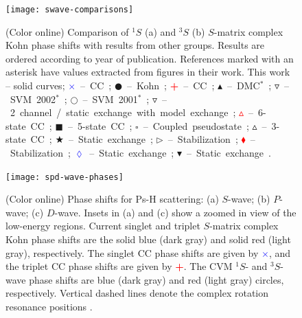 \documentclass[preprint,showpacs,showkeys,preprintnumbers,amsmath,amssymb,longbibliography,pra,aps]{revtex4-1}
\begin{document}
{%
\begin{figure}[H]
	\centering
	\texttt{[image: swave-comparisons]}
	\caption{(Color online) Comparison of $^1S$ (a) and $^3S$ (b) $S$-matrix
complex Kohn phase shifts with results from other groups. Results are ordered
according to year of publication. References marked with an asterisk have values
extracted from figures in their work. 
This work -- solid curves;
\mbox{\textcolor{blue}{$\times$} -- CC \cite{Walters2004};}
\mbox{$\CIRCLE$ -- Kohn \cite{VanReeth2003};}
\mbox{\textcolor{red}{\textbf{+}} -- CC \cite{Blackwood2002};}
\mbox{$\blacktriangle$ -- DMC$^*$ \cite{Chiesa2002};} 
\mbox{$\triangledown$ -- SVM 2002$^*$ \cite{Ivanov2002};} 
\mbox{$\Circle$ -- SVM 2001$^*$ \cite{Ivanov2001};} 
\mbox{\textcolor[RGB]{0,127,0}{$\triangledown$} -- 2 channel / static exchange with model exchange \cite{Biswas2001};} 
\mbox{\textcolor{red}{$\vartriangle$} -- 6-state CC \cite{Sinha2000};} 
\mbox{$\blacksquare$ -- 5-state CC \cite{Adhikari1999};} 
\mbox{$\square$ -- Coupled pseudostate \cite{Campbell1998};} 
\mbox{$\vartriangle$ -- 3-state CC \cite{Sinha1997};} 
\mbox{\textcolor[RGB]{0,127,0}{$\bigstar$} -- Static exchange \cite{Ray1997,*Ray1996};} 
\mbox{$\triangleright$ -- Stabilization \cite{Drachman1976};} 
\mbox{\textcolor{red}{$\blacklozenge$} -- Stabilization \cite{Drachman1975};}
\mbox{\textcolor{blue}{$\lozenge$} -- Static exchange \cite{Hara1975};}
\mbox{$\blacktriangledown$ -- Static exchange \cite{Fraser1961}.}}
	\label{fig:swave-comparisons}
\end{figure}

\begin{figure}[H]
	\centering
	\texttt{[image: spd-wave-phases]}
	\caption{(Color online) Phase shifts for Ps-H scattering: (a) $S$-wave;
(b) $P$-wave; (c) $D$-wave. Insets in (a) and (c) show a zoomed in view of 
the low-energy regions. Current singlet and triplet $S$-matrix complex Kohn
phase shifts are the solid blue (dark gray)
and solid red (light gray), respectively. The singlet CC phase shifts
\cite{Walters2004} are given by \mbox{\textcolor{blue}{$\times$}}, and the
triplet CC phase shifts \cite{Blackwood2002} are given by
\mbox{\textcolor{red}{\textbf{+}}}. The CVM $^1S$- and $^3S$-wave phase shifts
\cite{Zhang2012} are blue (dark gray) and red (light gray) circles,
respectively. Vertical dashed lines denote the complex rotation resonance
positions \cite{Yan1999,Yan1998a,Ho1998}.}
	\label{fig:spd-wave-phases}
\end{figure}

}
\end{document}
